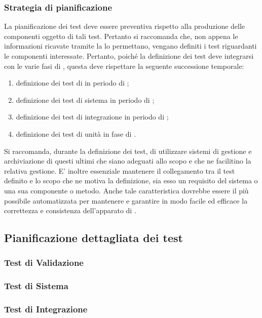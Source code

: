 \documentclass[12pt,a4paper]{article}
\begin{document}
\subsubsection{Strategia di pianificazione}
La pianificazione dei test deve essere preventiva rispetto alla produzione delle componenti oggetto di tali test. Pertanto si raccomanda che, non appena le informazioni ricavate tramite la  lo permettano, vengano definiti i test riguardanti le componenti interessate.
Pertanto, poiché la definizione dei test deve integrarsi con le varie fasi di , questa deve rispettare la seguente successione temporale:
\begin{enumerate}
	\item definizione dei test di   in periodo di \FA;
	\item definizione dei test di sistema in periodo di \FAD;
	\item definizione dei test di integrazione in periodo di \FPA;
	\item definizione dei test di unità in fase di \FPD.
	\end{enumerate}
Si raccomanda, durante la definizione dei test, di utilizzare sistemi di gestione e archiviazione di questi ultimi che siano adeguati allo scopo e che ne facilitino la relativa gestione. E' inoltre essenziale mantenere il collegamento tra il test definito e lo scopo che ne motiva la definizione, sia esso un requisito del sistema o una sua componente o metodo. Anche tale caratteristica dovrebbe essere il più possibile automatizzata per mantenere e garantire in modo facile ed efficace la correttezza e consistenza dell'apparato di .

\subsection{Pianificazione dettagliata dei test}\label{test_pianificazione}
\subsubsection{Test di Validazione}\label{test_validazione}
\subsubsection{Test di Sistema}\label{test_sistema}
\subsubsection{Test di Integrazione}\label{test_integrazione}
\end{document}
